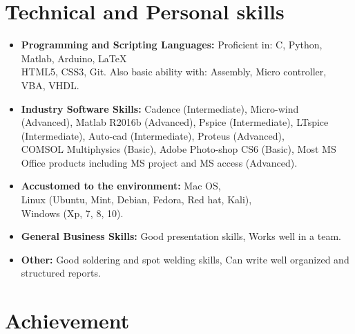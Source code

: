 \documentclass[11pt,a4paper,sans]{moderncv}        %
\begin{document}
\section{Technical and Personal skills}

\vspace{6pt}

\begin{itemize}

\item \textbf{Programming and Scripting Languages:} Proficient in: C, Python, Matlab, Arduino, LaTeX \\ HTML5, CSS3, Git. Also basic ability with: Assembly, Micro controller, VBA, VHDL.

\vspace{6pt}

\item \textbf{Industry Software Skills:} Cadence (Intermediate), Micro-wind (Advanced), Matlab R2016b (Advanced), Pspice (Intermediate), LTspice (Intermediate), Auto-cad (Intermediate), Proteus (Advanced), \\COMSOL Multiphysics (Basic), Adobe Photo-shop CS6 (Basic), Most MS Office products including MS project and MS access (Advanced).

\vspace{6pt}

\item \textbf{Accustomed to the environment:} Mac OS,\\ Linux (Ubuntu, Mint, Debian, Fedora, Red hat, Kali), \\ Windows (Xp, 7, 8, 10).

\vspace{6pt}

\item \textbf{General Business Skills:} Good presentation skills, Works well in a team.

\vspace{6pt}

\item \textbf{Other:} Good soldering and spot welding skills, Can write well organized and structured reports.

\end{itemize}

\section{Achievement}

\vspace{6pt}
\end{document}
